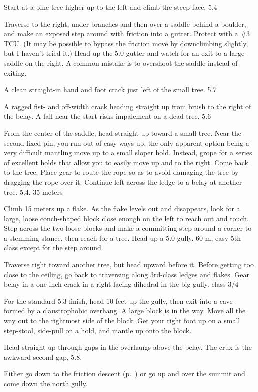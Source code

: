 \documentclass{tahquitz}
\begin{document}
 Start at a pine tree higher up to the left and climb
the steep face. 5.4

 Traverse to the right, under branches and then over a saddle behind a boulder, and make
an exposed step around with friction into a gutter.  Protect with a
\#3 TCU. (It may be possible to bypass the friction move by downclimbing
slightly, but I haven't tried it.) Head up the 5.0 gutter and watch for an exit to a large saddle
on the right. A common mistake is to overshoot the saddle instead of
exiting.

 A clean straight-in hand and foot crack just left of the small
tree. 5.7

 A ragged fist- and off-width crack heading straight up from brush
to the right of the belay. A fall near the start risks impalement on a dead tree. 5.6

 From the center of the saddle, head straight up toward a small
tree. Near the second fixed pin, you run out of easy ways up, the
only apparent option being a very difficult mantling move up to a
small sloper hold. Instead, grope for a series of excellent holds that allow
you to easily move up and to the right. Come back to the tree. Place
gear to route the rope so as to avoid damaging the tree by dragging
the rope over it. Continue left across the ledge to a belay at
another tree. 5.4, 35 meters

 Climb 15 meters up a flake. As the flake levels out and
disappears, look for a large, loose conch-shaped block close enough
on the left to reach out and touch. Step across the two loose blocks and
make a committing step around a corner to a stemming stance, then
reach for a tree. Head up a 5.0 gully. 60 m, easy 5th class except for
the step around.

 Traverse right toward another tree, but head upward before
it.  Before getting too close to the ceiling, go back to traversing
along 3rd-class ledges and flakes.  Gear belay in a one-inch
crack in a right-facing dihedral in the big gully. class 3/4

 For the standard 5.3 finish, head 10 feet up the gully,
then exit into a cave formed by a claustrophobic overhang. 
A large block is in the way.
Move all the way out to the rightmost side of
the block. Get your right foot up on a small step-stool,
side-pull on a hold, and mantle up onto the block.

 Head straight up through gaps in the overhangs above
the belay. The crux is the awkward second gap, 5.8.

Either go down to the friction descent (p.~\pageref{subsec:friction-descent})
or go up and over the summit
and come down the north gully.

\myfooter\vfill %
\end{document}
